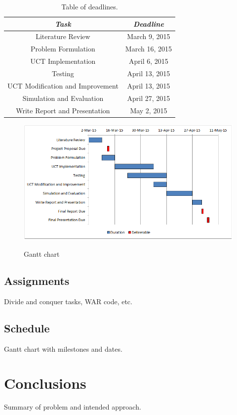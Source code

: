 \documentclass[a4paper,11pt]{article}
\begin{document}
%
\begin{table}[tbp]
  \centering
  \begin{tabular}{|c|c|}
    \hline
    \emph{Task} & \emph{Deadline} \\ 
    \hline
    Literature Review & March 9, 2015 \\ \hline
    Problem Formulation & March 16, 2015 \\ \hline
    UCT Implementation & April 6, 2015 \\ \hline
    Testing & April 13, 2015 \\ \hline
    UCT Modification and Improvement & April 13, 2015 \\ \hline
    Simulation and Evaluation & April 27, 2015 \\ \hline
    Write Report and Presentation & May 2, 2015 \\ \hline
  \end{tabular}
  \caption{Table of deadlines.}
  \label{tab:deadlines}
\end{table}

%
\begin{figure}[tbp]
  \centering
  \includegraphics[width=0.95\columnwidth]{gantt_chart}
  \label{fig:gantt}
  \caption{Gantt chart}
\end{figure}

\subsection{Assignments}\label{sec:assignments}
Divide and conquer tasks, WAR code, etc.

\subsection{Schedule}\label{sec:schedule}
Gantt chart with milestones and dates.

%
\section{Conclusions}\label{sec:conclusions}
Summary of problem and intended approach.




\end{document}
